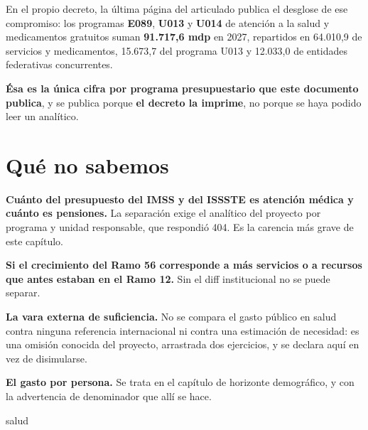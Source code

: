 En el propio decreto, la última página del articulado publica el desglose de ese
compromiso: los programas \textbf{E089}, \textbf{U013} y \textbf{U014} de atención a la
salud y medicamentos gratuitos suman \textbf{91.717,6 mdp} en 2027, repartidos en
64.010,9 de servicios y medicamentos, 15.673,7 del programa U013 y 12.033,0 de entidades
federativas concurrentes.

\textbf{Ésa es la única cifra por programa presupuestario que este documento publica}, y se
publica porque \textbf{el decreto la imprime}, no porque se haya podido leer un analítico.

\section{Qué no sabemos}

\begin{list}{}{\setlength{\leftmargin}{1.4em}\setlength{\itemsep}{2pt}}
\item[$\bullet$] \textbf{Cuánto del presupuesto del IMSS y del ISSSTE es atención médica y
cuánto es pensiones.} La separación exige el analítico del proyecto por programa y unidad
responsable, que respondió 404. Es la carencia más grave de este capítulo.
\item[$\bullet$] \textbf{Si el crecimiento del Ramo 56 corresponde a más servicios o a
recursos que antes estaban en el Ramo 12.} Sin el diff institucional no se puede separar.
\item[$\bullet$] \textbf{La vara externa de suficiencia.} No se compara el gasto público en
salud contra ninguna referencia internacional ni contra una estimación de necesidad: es una
omisión conocida del proyecto, arrastrada dos ejercicios, y se declara aquí en vez de
disimularse.
\item[$\bullet$] \textbf{El gasto por persona.} Se trata en el capítulo de horizonte
demográfico, y con la advertencia de denominador que allí se hace.
\end{list}

\begin{ficha}{salud}
\end{ficha}

